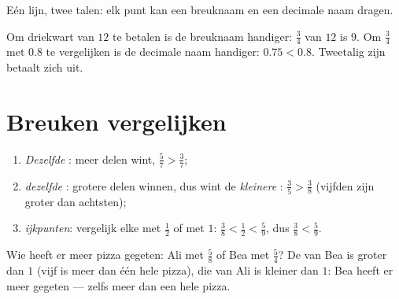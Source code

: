 \begin{omfigure}

{\small Eén lijn, twee talen: elk punt kan een breuknaam en een decimale
naam dragen.}
\end{omfigure}

\begin{example}\label{ex:g5:fractions:choose}
Om driekwart van $12$ te betalen is de breuknaam handiger: $\frac34$ van
$12$ is $9$. Om $\frac34$ met $0.8$ te vergelijken is de decimale naam
handiger: $0.75 < 0.8$. Tweetalig zijn betaalt zich uit.
\end{example}

\section{Breuken vergelijken}

\begin{method}\label{met:g5:fractions:compare}
\begin{enumerate}
  \item \emph{Dezelfde }: meer delen wint, $\frac57 > \frac37$;
  \item \emph{dezelfde }: grotere delen winnen, dus wint de
        \emph{kleinere} : $\frac35 > \frac38$ (vijfden zijn groter
        dan achtsten);
  \item \emph{ijkpunten}: vergelijk elke  met $\frac12$ of met $1$:
        $\frac38 < \frac12 < \frac59$, dus $\frac38 < \frac59$.
\end{enumerate}
\end{method}

\begin{example}\label{ex:g5:fractions:compare}
Wie heeft er meer pizza gegeten: Ali met $\frac58$ of Bea met $\frac54$? De
 van Bea is groter dan $1$ (vijf  is meer dan één hele pizza),
die van Ali is kleiner dan $1$: Bea heeft er meer gegeten --- zelfs meer dan
een hele pizza.
\end{example}

